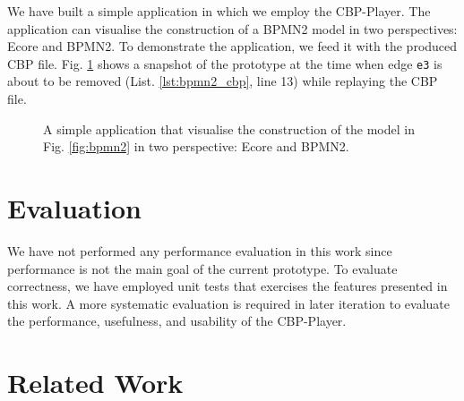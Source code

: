 \documentclass[conference]{IEEEtran}
\begin{document}
We have built a simple application in which we employ the CBP-Player. 
The application can visualise the construction of a BPMN2 model in two perspectives: Ecore and BPMN2. 
To demonstrate the application, we feed it with the produced CBP file. 
Fig. \ref{fig:prototype} shows a snapshot of the prototype at the time when edge \texttt{e3} 
is about to be removed (List. \ref{lst:bpmn2_cbp}, line 13) while replaying the CBP file.

\begin{figure}[h]
    \caption{A simple application that visualise the construction of the model in Fig. \ref{fig:bpmn2} in two perspective:
        Ecore and BPMN2.}
    \label{fig:prototype}
\end{figure}

\section{Evaluation}
\label{sec:evaluation}
We have not performed any performance evaluation in this work 
since performance is not the main goal of the current prototype.
To evaluate correctness, we have employed unit tests that exercises the features 
presented in this work. A more systematic evaluation is required in later iteration 
to evaluate the performance, usefulness, and usability of the CBP-Player.

\section{Related Work}
\label{sec:related_work}
\end{document}
